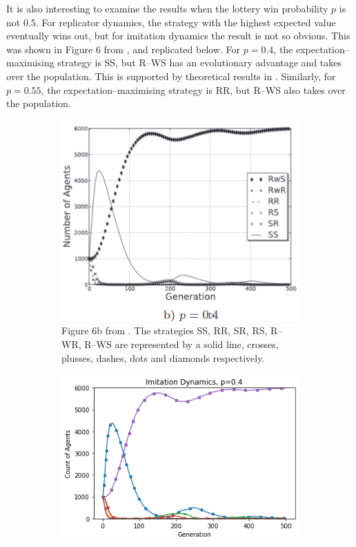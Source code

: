  It is also interesting to examine the results when the lottery win probability $p$ is not 0.5. For replicator dynamics, the strategy with the highest expected value eventually wins out, but for imitation dynamics the result is not so obvious. This was shown in Figure 6 from \cite{RN30}, and replicated below. For $p=0.4$, the expectation--maximising strategy is SS, but R--WS has an evolutionary advantage and takes over the population. This is supported by theoretical results in \cite{RN30}. Similarly, for $p=0.55$, the expectation--maximising strategy is RR, but R--WS also takes over the population. \\
 
 \FloatBarrier 
\begin{figure}[!h]
  \begin{subfigure}[b]{0.45\textwidth}
    \includegraphics[width=\textwidth]{images/lotteryp4.png}
    \caption{Figure 6b from \cite{RN30}. The strategies SS, RR, SR, RS, R--WR, R--WS are represented by a solid line, crosses, plusses, dashes, dots and diamonds respectively.}
    \label{lotteryp4}
  \end{subfigure}
  \hfill
  \begin{subfigure}[b]{0.45\textwidth}
    \includegraphics[width=1.25\textwidth]{images/lotteryp4_me.png}

\end{subfigure}
\end{figure}

